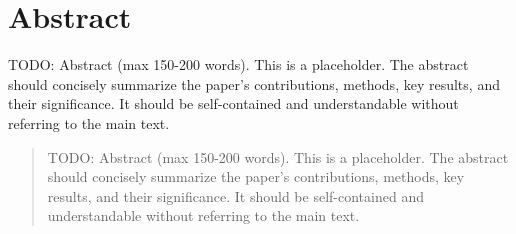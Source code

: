 \section{Abstract}
TODO: Abstract (max 150-200 words). This is a placeholder.
The abstract should concisely summarize the paper's contributions, methods,
key results, and their significance. It should be self-contained and
understandable without referring to the main text.

\begin{abstract}
  TODO: Abstract (max 150-200 words). This is a placeholder.
  The abstract should concisely summarize the paper's contributions, methods,
  key results, and their significance. It should be self-contained and
  understandable without referring to the main text.
\end{abstract}
